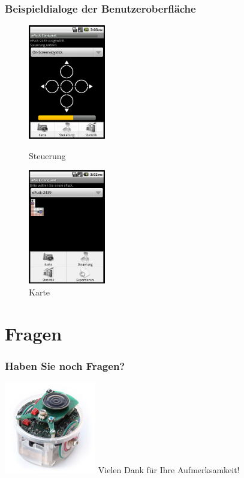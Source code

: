 \documentclass{beamer}
\begin{document}
\begin{frame}
  \frametitle{Beispieldialoge der Benutzeroberfläche}
	\begin{figure}[bp]
		\begin{minipage}[]{3.5cm}
			\includegraphics[height=5cm]{view1.png} 
			\caption{Steuerung}
		\end{minipage}
		\hspace{1cm}
		\begin{minipage}[]{3.5cm}
			\includegraphics[height=5cm]{view2.png} 
			\caption{Karte}
		\end{minipage}
	\end{figure}
\end{frame}



\section{Fragen}
\begin{frame}
	\frametitle{Haben Sie noch Fragen?}
		\includegraphics[height=4cm]{ende.jpg}
		\vspace{1cm}
	Vielen Dank für Ihre Aufmerksamkeit!
\end{frame}
\end{document}
